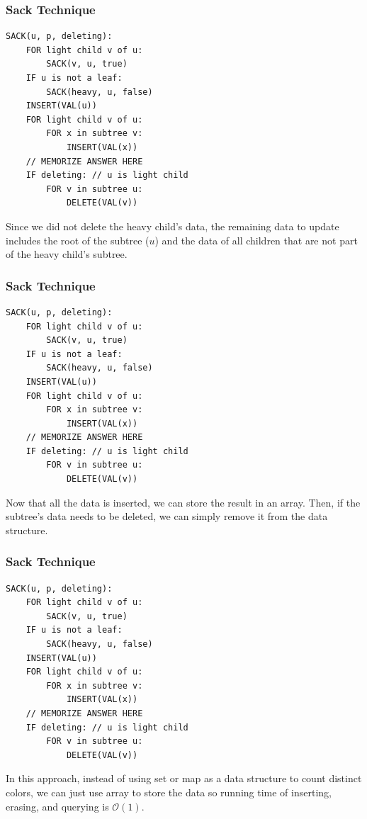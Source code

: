 \begin{frame}[fragile]
\frametitle{Sack Technique}  

\begin{small}
\begin{verbatim}
SACK(u, p, deleting):
    FOR light child v of u:
        SACK(v, u, true)
    IF u is not a leaf:
        SACK(heavy, u, false) 
    INSERT(VAL(u))
    FOR light child v of u:
        FOR x in subtree v:
            INSERT(VAL(x))
    // MEMORIZE ANSWER HERE
    IF deleting: // u is light child
        FOR v in subtree u:
            DELETE(VAL(v))
\end{verbatim}
\end{small}

Since we did not delete the heavy child's data, the remaining data to update includes the root of the subtree ($u$) and the data of all children that are not part of the heavy child's subtree.
    
\end{frame}

\begin{frame}[fragile]
\frametitle{Sack Technique}  

\begin{small}
\begin{verbatim}
SACK(u, p, deleting):
    FOR light child v of u:
        SACK(v, u, true)
    IF u is not a leaf:
        SACK(heavy, u, false) 
    INSERT(VAL(u))
    FOR light child v of u:
        FOR x in subtree v:
            INSERT(VAL(x))
    // MEMORIZE ANSWER HERE
    IF deleting: // u is light child
        FOR v in subtree u:
            DELETE(VAL(v))
\end{verbatim}
\end{small}

Now that all the data is inserted, we can store the result in an array. Then, if the subtree's data needs to be deleted, we can simply remove it from the data structure.
    
\end{frame}

\begin{frame}[fragile]
\frametitle{Sack Technique}  

\begin{small}
\begin{verbatim}
SACK(u, p, deleting):
    FOR light child v of u:
        SACK(v, u, true)
    IF u is not a leaf:
        SACK(heavy, u, false) 
    INSERT(VAL(u))
    FOR light child v of u:
        FOR x in subtree v:
            INSERT(VAL(x))
    // MEMORIZE ANSWER HERE
    IF deleting: // u is light child
        FOR v in subtree u:
            DELETE(VAL(v))
\end{verbatim}
\end{small}

In this approach, instead of using set or map as a data structure to count distinct colors, we can just use array to store the data so running time of inserting, erasing, and querying is $\mathcal{O}(1)$.
    
\end{frame}

